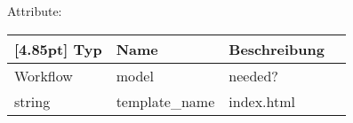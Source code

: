         Attribute:
        \begin{center}
        	\renewcommand{\arraystretch}{1.5}
            \setlength\tabcolsep{5pt}
        	\begin{tabularx}{\textwidth}{|l|l|l|X|}
        		\hline
                \rowcolor[gray]{0.75}[4.85pt]            		
        	    Typ & Name & Beschreibung \\ \hline
        	    Workflow & model & needed? \\ \hline
        		string & template_name & index.html \\ \hline
				
				\hline            		
        	\end{tabularx}
        \end{center}

